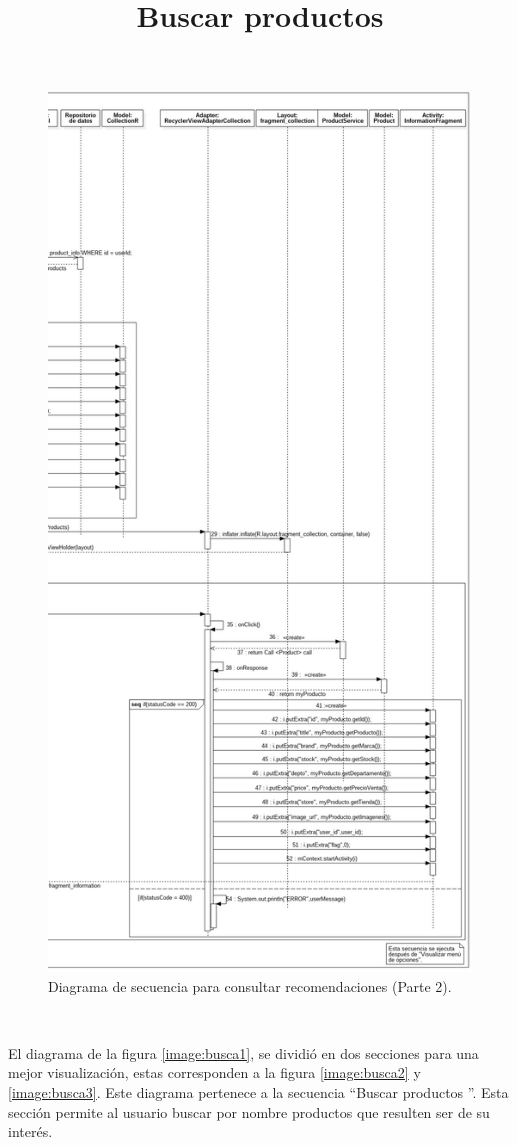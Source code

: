 \FloatBarrier
\begin{figure}[htbp!]
		\centering
			\includegraphics[width=.62 \textwidth]{imagenes/Diagramas_UserApp/Nuevos_diagramas/Recomendaciones2}
		\caption{Diagrama de secuencia para consultar recomendaciones (Parte 2).}
		\label{image:rec3}
\end{figure}
\FloatBarrier

\title{\textbf{Buscar productos}}
\\ \par
El diagrama de la figura \ref{image:busca1}, se dividió en dos secciones para una mejor visualización, estas corresponden a la figura \ref{image:busca2} y \ref{image:busca3}. Este diagrama pertenece a la secuencia ``Buscar productos ''. Esta sección permite al usuario buscar por nombre productos que resulten ser de su interés.

